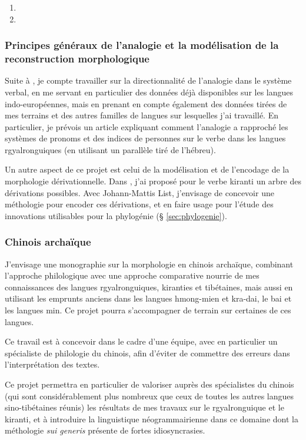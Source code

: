 \documentclass[oldfontcommands,oneside,a4paper,11pt]{article}
\begin{document}
\begin{enumerate}
 \item  {}
  \item  {}
\end{enumerate}

\subsubsection{Principes généraux de l'analogie et la modélisation de la reconstruction morphologique}
Suite à \citet{jacques16ebde}, je compte travailler sur la directionnalité de l'analogie dans le système verbal, en me servant en particulier des données déjà disponibles sur les langues indo-européennes, mais en prenant en compte également des données tirées de mes terrains et des autres familles de langues sur lesquelles j'ai travaillé. En particulier, je prévois un article expliquant comment l'analogie a rapproché les systèmes de pronoms et des indices de personnes sur le verbe dans les langues rgyalronguiques (en utilisant un parallèle tiré de l'hébreu).

Un autre aspect de ce projet est celui de la modélisation et de l'encodage de la morphologie dérivationnelle. Dans \citet{jacques17pkiranti}, j'ai proposé pour le verbe kiranti un arbre des dérivations possibles. Avec Johann-Mattis List, j'envisage de concevoir une méthologie pour encoder ces dérivations, et en faire usage pour l'étude des innovations utilisables pour la phylogénie (§ \ref{sec:phylogenie}).

\subsubsection{Chinois archaïque} 

J'envisage une monographie sur la morphologie en chinois archaïque, combinant l'approche philologique avec une approche comparative nourrie de mes connaissances des langues rgyalronguiques, kiranties et tibétaines, mais aussi en utilisant les emprunts anciens dans les langues hmong-mien et kra-dai, le bai et les langues min. Ce projet pourra s'accompagner de terrain sur certaines de ces langues.

Ce travail est à concevoir dans le cadre d'une équipe, avec en particulier un spécialiste de philologie du chinois, afin d'éviter de commettre des erreurs dans l'interprétation des textes.  

Ce projet permettra en particulier de valoriser auprès des spécialistes du chinois (qui sont considérablement plus nombreux que ceux de toutes les autres langues sino-tibétaines réunis) les résultats de mes travaux sur le rgyalronguique et le kiranti, et à introduire la linguistique néogrammairienne dans ce domaine dont la méthologie \textit{sui generis} présente de fortes idiosyncrasies.
\end{document}
